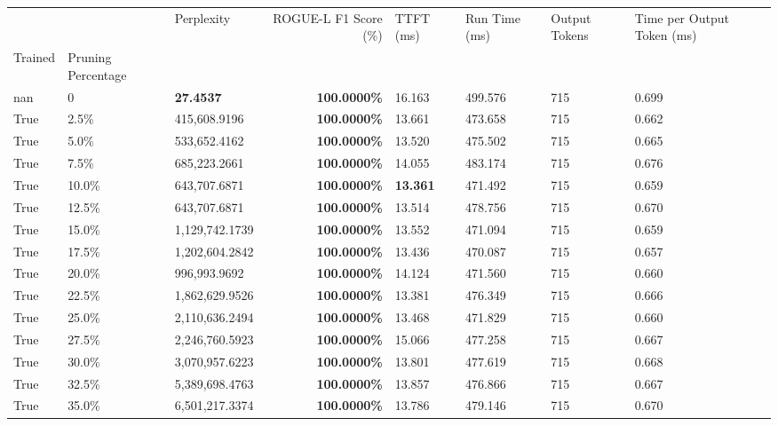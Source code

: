 \begin{table}[H]
\label{tab:evaluation-pipeline-2-trained}
\begin{tabular}{lllrllll}
\toprule
 &  & Perplexity & ROGUE-L F1 Score (\%) & TTFT (ms) & Run Time (ms) & Output Tokens & Time per Output Token (ms) \\
Trained & Pruning Percentage &  &  &  &  &  &  \\
\midrule
nan & 0 & \bfseries 27.4537 & \bfseries 100.0000\% & 16.163 & 499.576 & 715 & 0.699 \\
\cline{1-8}
True & 2.5\% & 415,608.9196 & \bfseries \color{red} 100.0000\% & 13.661 & 473.658 & 715 & 0.662 \\
\cline{1-8}
True & 5.0\% & 533,652.4162 & \bfseries \color{red} 100.0000\% & 13.520 & 475.502 & 715 & 0.665 \\
\cline{1-8}
True & 7.5\% & 685,223.2661 & \bfseries \color{red} 100.0000\% & 14.055 & 483.174 & 715 & 0.676 \\
\cline{1-8}
True & 10.0\% & 643,707.6871 & \bfseries \color{red} 100.0000\% & \bfseries \color{red} 13.361 & 471.492 & 715 & 0.659 \\
\cline{1-8}
True & 12.5\% & 643,707.6871 & \bfseries \color{red} 100.0000\% & 13.514 & 478.756 & 715 & 0.670 \\
\cline{1-8}
True & 15.0\% & 1,129,742.1739 & \bfseries \color{red} 100.0000\% & 13.552 & 471.094 & 715 & 0.659 \\
\cline{1-8}
True & 17.5\% & 1,202,604.2842 & \bfseries \color{red} 100.0000\% & 13.436 & 470.087 & 715 & 0.657 \\
\cline{1-8}
True & 20.0\% & 996,993.9692 & \bfseries \color{red} 100.0000\% & 14.124 & 471.560 & 715 & 0.660 \\
\cline{1-8}
True & 22.5\% & 1,862,629.9526 & \bfseries \color{red} 100.0000\% & 13.381 & 476.349 & 715 & 0.666 \\
\cline{1-8}
True & 25.0\% & 2,110,636.2494 & \bfseries \color{red} 100.0000\% & 13.468 & 471.829 & 715 & 0.660 \\
\cline{1-8}
True & 27.5\% & 2,246,760.5923 & \bfseries \color{red} 100.0000\% & 15.066 & 477.258 & 715 & 0.667 \\
\cline{1-8}
True & 30.0\% & 3,070,957.6223 & \bfseries \color{red} 100.0000\% & 13.801 & 477.619 & 715 & 0.668 \\
\cline{1-8}
True & 32.5\% & 5,389,698.4763 & \bfseries \color{red} 100.0000\% & 13.857 & 476.866 & 715 & 0.667 \\
\cline{1-8}
True & 35.0\% & 6,501,217.3374 & \bfseries \color{red} 100.0000\% & 13.786 & 479.146 & 715 & 0.670 \\

\end{tabular}
\end{table}

